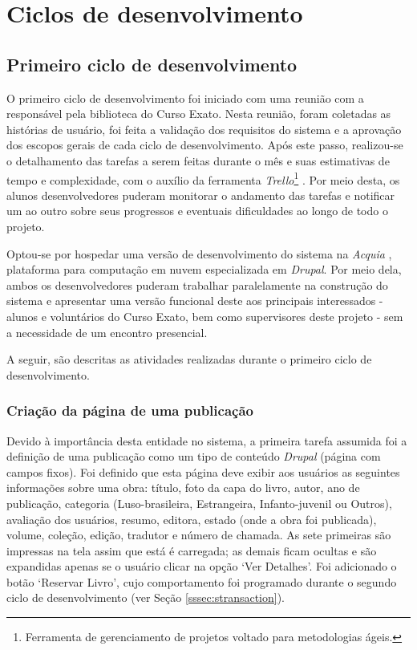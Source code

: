 \documentclass[a4paper]{article}
\begin{document}
\section{Ciclos de desenvolvimento}
\subsection{Primeiro ciclo de desenvolvimento}

O primeiro ciclo de desenvolvimento foi iniciado com uma reunião com a responsável pela biblioteca do Curso Exato. Nesta reunião, foram coletadas as histórias de usuário, foi feita a validação dos requisitos do sistema e a aprovação dos escopos gerais de cada ciclo de desenvolvimento. Após este passo, realizou-se o detalhamento das tarefas a serem feitas durante o mês e suas estimativas de tempo e complexidade, com o auxílio da ferramenta \textit{Trello}\footnote{Ferramenta de gerenciamento de projetos voltado para metodologias ágeis.} \cite{trello}. Por meio desta, os alunos desenvolvedores puderam monitorar o andamento das tarefas e notificar um ao outro sobre seus progressos e eventuais dificuldades ao longo de todo o projeto.

Optou-se por hospedar uma versão de desenvolvimento do sistema na \textit{Acquia} \cite{acquia}, plataforma para computação em nuvem especializada em \textit{Drupal}. Por meio dela, ambos os desenvolvedores puderam trabalhar paralelamente na construção do sistema e apresentar uma versão funcional deste aos principais interessados - alunos e voluntários do Curso Exato, bem como supervisores deste projeto - sem a necessidade de um encontro presencial.

A seguir, são descritas as atividades realizadas durante o primeiro ciclo de desenvolvimento.

\subsubsection{Criação da página de uma publicação}

Devido à importância desta entidade no sistema, a primeira tarefa assumida foi a definição de uma publicação como um tipo de conteúdo \textit{Drupal} (página com campos fixos). Foi definido que esta página deve exibir aos usuários as seguintes informações sobre uma obra: título, foto da capa do livro, autor, ano de publicação, categoria (Luso-brasileira, Estrangeira, Infanto-juvenil ou Outros), avaliação dos usuários, resumo, editora, estado (onde a obra foi publicada), volume, coleção, edição, tradutor e número de chamada. As sete primeiras são impressas na tela assim que está é carregada; as demais ficam ocultas e são expandidas apenas se o usuário clicar na opção ‘Ver Detalhes’. Foi adicionado o botão ‘Reservar Livro’, cujo comportamento foi programado durante  o segundo ciclo de desenvolvimento (ver Seção {\ref{sssec:stransaction}}).
\end{document}
